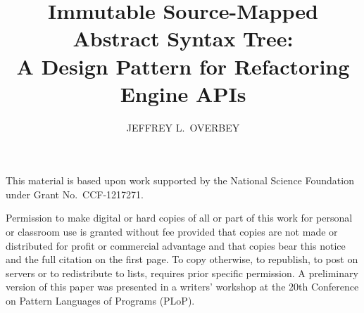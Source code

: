 \documentclass[prodmode]{acmlarge}
\title{Immutable Source-Mapped Abstract Syntax Tree: \\
A Design Pattern for Refactoring Engine APIs} %
\author{JEFFREY L.\ OVERBEY \affil{Auburn University}}
\begin{document}
\begin{bottomstuff}
This material is based upon work supported by the National Science Foundation
under Grant No.~CCF-1217271.

Permission to make digital or hard copies of all or part of this work for
personal or classroom use is granted without fee provided that copies are not
made or distributed for profit or commercial advantage and that copies bear
this notice and the full citation on the first page. To copy otherwise, to
republish, to post on servers or to redistribute to lists, requires prior
specific permission. A preliminary version of this paper was presented in a
writers' workshop at the 20th Conference on Pattern Languages of Programs
(PLoP).
\end{bottomstuff}


\maketitle
\end{document}
